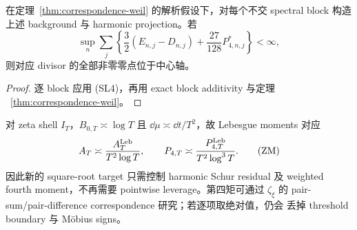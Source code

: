 \begin{theorem}
\label{thm:schur-l4-weil}
在定理~\ref{thm:correspondence-weil} 的解析假设下，对每个不交 spectral block
构造上述 background 与 harmonic projection。若
\[
 \sup_n\sum_j\left\{\frac32(E_{n,j}-D_{n,j})
              +\frac{27}{128}P^*_{4,n,j}\right\}<\infty, \tag{LW}
\]
则对应 divisor 的全部非零零点位于中心轴。
\end{theorem}

\begin{proof}
逐 block 应用 (SL4)，再用 exact block additivity 与定理
~\ref{thm:correspondence-weil}。
\end{proof}

对 zeta shell $I_T$，$B_{0,T}\asymp\log T$ 且
$\dd\mu\asymp\dd t/T^2$，故 Lebesgue moments 对应
\[
 A_T\asymp\frac{A_T^{\rm Leb}}{T^2\log T},\qquad
 P_{4,T}\asymp\frac{P_{4,T}^{\rm Leb}}{T^2\log^3T}. \tag{ZM}
\]
因此新的 square-root target 只需控制 harmonic Schur residual 及 weighted fourth
moment，不再需要 pointwise leverage。第四矩可通过
$\zeta_\xi$ 的 pair-sum/pair-difference correspondence 研究；若逐项取绝对值，仍会
丢掉 threshold boundary 与 M\"obius signs。

